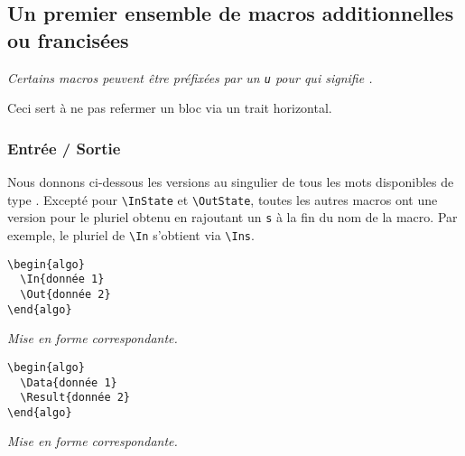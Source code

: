 \documentclass[12pt,a4paper]{article}
\begin{document}

\subsection{Un premier ensemble de macros additionnelles ou francisées}

\begin{frame-gene}
	\centering\itshape
	Certains macros peuvent être préfixées par un \verb+u+ pour  qui signifie .
	
	Ceci sert à ne pas refermer un bloc via un trait horizontal.
\end{frame-gene}


\subsubsection{Entrée / Sortie}

Nous donnons ci-dessous les versions au singulier de tous les mots disponibles de type .
Excepté pour \verb+\InState+ et \verb+\OutState+, toutes les autres macros ont une version pour le pluriel obtenu en rajoutant un \verb+s+ à la fin du nom de la macro.
Par exemple, le pluriel de \verb+\In+ s'obtient via \verb+\Ins+.


\begin{multicols}{2}
    \centering
    \begin{frame-gene}
\begin{verbatim}
\begin{algo}
  \In{donnée 1}
  \Out{donnée 2}
\end{algo}
\end{verbatim}
    \end{frame-gene}
    \vfill\null
    \columnbreak
    \textit{Mise en forme correspondante.}
\begin{algo}
\end{algo}
    \vfill\null
\end{multicols}


\begin{multicols}{2}
    \centering
    \begin{frame-gene}
\begin{verbatim}
\begin{algo}
  \Data{donnée 1}
  \Result{donnée 2}
\end{algo}
\end{verbatim}
    \end{frame-gene}
    \vfill\null
    \columnbreak
    \textit{Mise en forme correspondante.}
\begin{algo}
\end{algo}
    \vfill\null
\end{multicols}
\end{document}
